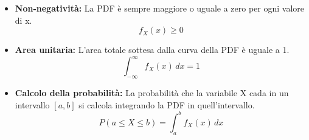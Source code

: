\begin{itemize}
    \item \textbf{Non-negatività:} La PDF è sempre maggiore o uguale a zero per ogni valore di x.
    $$ f_X(x) \ge 0 $$
    
    \item \textbf{Area unitaria:} L'area totale sottesa dalla curva della PDF è uguale a 1.
    $$ \int_{-\infty}^{\infty} f_X(x) \,dx = 1 $$
    
    \item \textbf{Calcolo della probabilità:} La probabilità che la variabile X cada in un intervallo $[a, b]$ si calcola integrando la PDF in quell'intervallo.
    $$ P(a \le X \le b) = \int_{a}^{b} f_X(x) \,dx $$
\end{itemize}